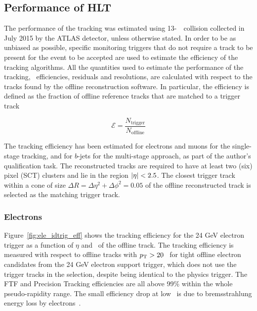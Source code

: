 



		\subsection{Performance of HLT}
		\label{sec:Trig_perf}

			The performance of the tracking was estimated using 13-\TeV\ \pp\ collision collected in July 2015 by the \ac{ATLAS} detector, unless otherwise stated. In order to be as unbiased as possible, specific monitoring triggers that do not require a track to be present for the event to be accepted are used to estimate the efficiency of the tracking algorithms. All the quantities used to estimate the performance of the tracking, \ie\ efficiencies, residuals and resolutions, are calculated with respect to the tracks found by the offline reconstruction software. In particular, the efficiency is defined as the fraction of offline reference tracks that are matched to a trigger track 

			\begin{equation}
				\mathcal{E} = \frac{N_{\mathrm{trigger}}}{N_{\mathrm{offline}}}
				\label{eq:trig_eff}
			\end{equation}

			The tracking efficiency has been estimated for electrons and muons for the single-stage tracking, and for $b$-jets for the multi-stage approach, as part of the author's qualification task. The reconstructed tracks are required to have at least two (six) pixel (SCT) clusters and lie in the region $|\eta| < 2.5$. The closest trigger track within a cone of size $\Delta R =  \Delta \eta^2 + \Delta \phi^2 = 0.05$ of the offline reconstructed track is selected as the matching trigger track.


			\subsubsection*{Electrons}

				Figure~\ref{fig:ele_idtrig_eff} shows the tracking efficiency for the 24 GeV electron trigger as a function of $\eta$ and \pt\ of the offline track. The tracking efficiency is measured with respect to offline tracks with $p_{\mathrm{T}} > 20$ \GeV\ for tight offline electron candidates from the 24 GeV electron support trigger, which does not use the trigger tracks in the selection, despite being identical to the physics trigger. The \ac{FTF} and Precision Tracking efficiencies are all above 99\% within the whole pseudo-rapidity range. The small efficiency drop at low \pt\ is due to bremsstrahlung energy loss by electrons~\cite{ATLASTrigger2015}.

